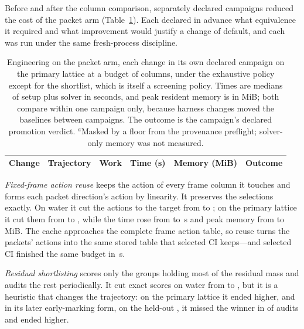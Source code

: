 \documentclass[aps,pra,reprint,superscriptaddress,nofootinbib,floatfix,
  showkeys,raggedbottom]{revtex4-2}
\begin{document}
Before and after the column comparison, separately declared campaigns
reduced the cost of the packet arm (Table~\ref{tab:ledger}). Each declared in
advance what equivalence it required and what improvement would justify a
change of default, and each was run under the same fresh-process discipline.

\begin{table}[t]
\caption{Engineering on the packet arm, each change in its own declared
campaign on the primary lattice at a budget of \pkLargeBudget{} columns,
under the exhaustive policy except for the shortlist, which is itself a
screening policy. Times are medians of setup plus solver in
seconds, and peak resident memory is in MiB; both compare within one
campaign only, because harness changes moved the baselines between campaigns.
The outcome is the campaign's declared promotion verdict.
$^{a}$Masked by a floor from the provenance preflight; solver-only memory was
not measured.}
\label{tab:ledger}
\begin{ruledtabular}
\begin{tabular}{llllll}
Change & Trajectory & Work & Time (s) & Memory (MiB) & Outcome \\
\hline

\end{tabular}
\end{ruledtabular}
\end{table}

\emph{Fixed-frame action reuse} keeps the action of every frame column it
touches and forms each packet direction's action by linearity. It preserves
the selections exactly. On water it cut the actions to the
\pkTightTarget{} target from \pkWaterPacketActions{} to
\pkWaterReuseActions{}; on the primary lattice it cut them from
\pkReuseActionsBefore{} to \pkReuseActionsAfter{}, while the time rose from
\pkReuseSecondsBefore{} to \pkReuseSecondsAfter{}\,s and peak memory from
\pkReuseRssBefore{} to \pkReuseRssAfter{}\,MiB. The cache approaches the
complete frame action table, so reuse turns the packets' actions into the
same stored table that selected CI keeps---and selected CI finished the same
budget in \pkLargeSciSeconds{}\,s.

\emph{Residual shortlisting} scores only the groups holding most of the
residual mass and audits the rest periodically. It cut exact scores on water
from \pkWaterPacketScores{} to \pkWaterShortlistScores{}, but it is a heuristic
that changes the trajectory: on the primary lattice it ended
\pkShortlistErrorChange{} higher, and in its later early-marking form, on the
held-out \pkLadderName{}, it missed the winner in \pkLadderEarlyMissed{} of \pkLadderEarlyAudits{} audits and ended
\pkLadderEarlyErrorChange{} higher.
\end{document}
